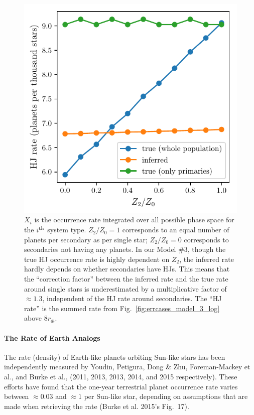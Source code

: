 \begin{figure}[!tb]
    \centering
    \includegraphics[width=.6\textwidth]{figures/HJ_correction_inputrate_vs_HJratevalues.pdf}
    \caption{
        $X_i$ is the occurrence rate integrated over all possible phase 
        space for the $i^{\rm th}$ system type. $Z_2/Z_0=1$ 
        corresponds to an equal number of planets per secondary as per single 
        star;
        $Z_2/Z_0=0$ corresponds to secondaries not having any 
        planets.
        In our Model \#3, though the true HJ occurrence rate 
        is highly dependent on $Z_2$, 
        the inferred rate hardly depends on whether secondaries have HJs.
        This means that the ``correction factor'' between the inferred rate 
        and the true rate around single stars is underestimated by a 
        multiplicative 
        factor of $\approx1.3$, independent of the HJ rate around secondaries.
        The ``HJ rate'' is the summed rate from     
        Fig.~\ref{fig:errcases_model_3_log} above $8r_\oplus$.
    }
    \label{fig:HJ_correction_inputrate_vs_HJratevalues}
\end{figure}


\paragraph{The Rate of Earth Analogs}
The rate (density) of Earth-like planets orbiting Sun-like stars has 
been independently measured by Youdin, Petigura, Dong \& Zhu, 
Foreman-Mackey et al., and Burke et al., (2011, 2013, 2013, 2014, and 2015 
respectively).
These efforts have found that the one-year terrestrial planet occurrence rate 
varies between $\approx 0.03$ and $\approx 1$ per Sun-like star, depending on 
assumptions that are made when retrieving the rate (Burke et al. 2015's 
Fig.~17).

